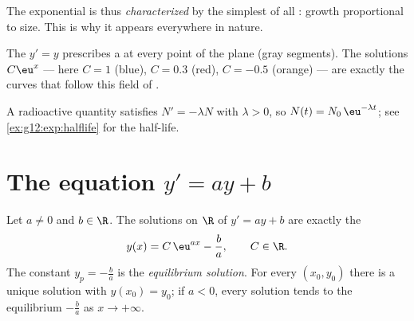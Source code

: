 \begin{remark}
The exponential is thus \emph{characterized} by the simplest of all
: growth proportional to size. This is why it appears
everywhere in nature.
\end{remark}

\begin{omfigure}

{\small The  $y' = y$ prescribes a  at every point of the
plane (gray segments). The solutions $C\eu^{x}$ --- here $C = 1$ (blue),
$C = 0.3$ (red), $C = -0.5$ (orange) --- are exactly the curves that
follow this field of .}
\end{omfigure}

\begin{example}\label{ex:g12:diffeq:decay}
A radioactive quantity satisfies $N' = -\lambda N$ with $\lambda > 0$, so
$N(t) = N_0\,\eu^{-\lambda t}$; see \cref{ex:g12:exp:halflife} for the
half-life.
\end{example}

\section{The equation \texorpdfstring{$y' = ay + b$}{y' = ay + b}}

\begin{theorem}[Solutions of $y' = ay + b$]\label{thm:g12:diffeq:affine}
Let $a \neq 0$ and $b \in \R$. The solutions on $\R$ of $y' = ay + b$ are
exactly the 
\[
y(x) = C\,\eu^{ax} - \frac{b}{a}, \qquad C \in \R .
\]
The constant  $y_p = -\frac ba$ is the \emph{equilibrium solution}.
For every $(x_0, y_0)$ there is a unique solution with $y(x_0) = y_0$; if
$a < 0$, every solution tends to the equilibrium $-\frac ba$ as
$x \to +\infty$.
\end{theorem}

